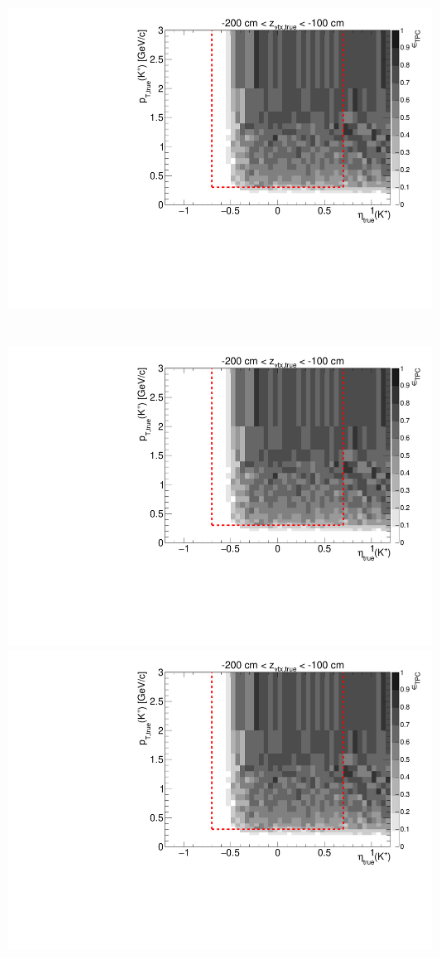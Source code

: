 \begin{figure}[hb]
{  \includegraphics[width=\linewidth,page=17]{graphics/eff/Eff2D_TPC_kaon_Plus.pdf}
}~
\parbox{0.495\textwidth}{
  \centering
  \includegraphics[width=\linewidth,page=12]{graphics/eff/Eff2D_TPC_kaon_Plus.pdf}\\
  \includegraphics[width=\linewidth,page=14]{graphics/eff/Eff2D_TPC_kaon_Plus.pdf}\\
}
\end{figure}
